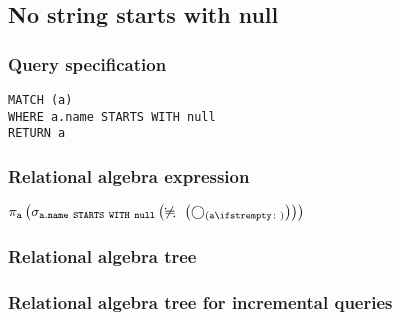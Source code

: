 \subsection{No string starts with null}

\subsubsection*{Query specification}

\begin{lstlisting}
MATCH (a)
WHERE a.name STARTS WITH null
RETURN a
\end{lstlisting}

\subsubsection*{Relational algebra expression}

$\projection{\var{a}} \left(\selection{\mathtt{a.name~STARTS~WITH~null}} \left(\alldifferent{} \left(\getvertices{a}{}\right)\right)\right)$

\subsubsection*{Relational algebra tree}


\subsubsection*{Relational algebra tree for incremental queries}


